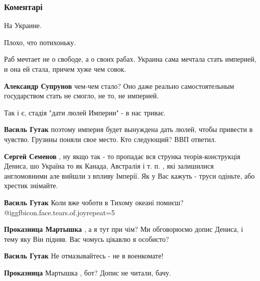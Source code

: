  
 
 
 
 
\subsubsection{Коментарі}

\begin{itemize} %
На Украине.

Плохо, что потихоньку.

Раб мечтает не о свободе, а о своих рабах. Украина сама мечтала стать империей, и она ей стала, причем хуже чем совок.

\begin{itemize} %
\textbf{Александр Супрунов} чем-чем стало? Оно даже реально самостоятельным государством стать не смогло, не то, не империей.
\end{itemize} %

Так і є, стадія "дати люлей Империи" - в нас триває.

\begin{itemize} %
\textbf{Василь Гутак} поэтому империя будет вынуждена дать люлей, чтобы привести в чувство. Грузины поняли свое место. Кто следующий? ВВП ответил.

\textbf{Сергей Семенов} , ну якщо так - то пропадає вся струнка теорія-конструкція Дениса, шо Україна то як Канада, Австралія і т. п. , які залишилися англомовними але вийшли з впливу Імперії.
Як у Вас кажуть - труси одіньте, або хрестик знімайте.

\textbf{Василь Гутак} Коли вже чоботи в Тихому океані помиєш? @igg{fbicon.face.tears.of.joy}{repeat=5} 

\textbf{Проказница Мартышка} , а я тут при чім? Ми обговорюємо допис Дениса, і тему яку Він підняв.
Вас чомусь цікавлю я особисто?

\textbf{Василь Гутак} Не отмазывайтесь - не в военкомате!

\textbf{Проказница} Мартышка , бот?
Допис не читали, бачу.
\end{itemize} %


\end{itemize}
